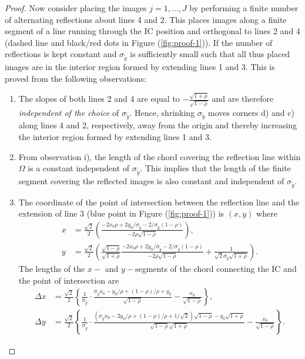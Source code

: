 \begin{proof}
  Now consider placing the images $j = 1, \ldots, J$ by performing a
  finite number of alternating reflections about lines 4 and 2. This
  places images along a finite segment of a line running through the
  IC position and orthogonal to lines 2 and 4 (dashed line and
  black/red dots in Figure (\ref{fig:proof-1})). If the number of
  reflections is kept constant and $\sigma_{\tilde{y}}$ is sufficiently
  small such that all thus placed images are in the interior region
  formed by extending lines 1 and 3. This is proved from the following
  observations:
  \begin{enumerate}
  \item The slopes of both lines 2 and 4 are equal to
    $-\frac{\sqrt{1+\rho}}{\sqrt{1-\rho}}$ and are therefore
    \textit{independent of the choice} of $\sigma_{\tilde{y}}$. Hence,
    shrinking $\sigma_{\tilde{y}}$ moves corners d) and c) along lines 4
    and 2, respectively, away from the origin and thereby increasing
    the interior region formed by extending lines 1 and 3.
  \item From observation i), the length of the chord covering the
    reflection line within $\Omega$ is a constant independent of
    $\sigma_{\tilde{y}}$.  This implies that the length of the finite
    segment covering the reflected images is also constant and
    independent of $\sigma_{\tilde{y}}$.
  \item The coordinate of the point of intersection between the
    reflection line and the extension of line 3 (blue point in Figure
    (\ref{fig:proof-1})) is $(x,y)$ where
    \begin{align*}
      x &= \frac{\sqrt{2}}{2} \left( \frac{-2 x_0\rho + 2
      y_0/\sigma_{\tilde{y}} -
      2/\sigma_{\tilde{y}}(1-\rho)}{-2\rho\sqrt{1-\rho}}\right), \\
      y &= \frac{\sqrt{2}}{2} \left( \frac{\sqrt{1-\rho}}{\sqrt{1+\rho}}\frac{-2 x_0\rho + 2
      y_0/\sigma_{\tilde{y}} -
      2/\sigma_{\tilde{y}}(1-\rho)}{-2\rho\sqrt{1-\rho}} +
      \frac{1}{\sqrt{2}\sigma_{\tilde{y}}\sqrt{1+\rho}} \right).
    \end{align*}
    The lengths of the $x-$ and $y-$segments of the chord connecting
    the IC and the point of intersection are
    \begin{align*}
      \Delta x &= \frac{\sqrt{2}}{2}\left\{ \frac{1}{\sigma_{\tilde{y}}}\cdot\frac{\sigma_{\tilde{y}}x_0 - y_0/\rho + (1-\rho)/\rho + y_0}{\sqrt{1-\rho}} - \frac{x_0}{\sqrt{1-\rho}} \right\},\\
      \Delta y &= \frac{\sqrt{2}}{2} \left\{ \frac{1}{\sigma_{\tilde{y}}}\cdot\frac{(\sigma_{\tilde{y}}x_0 - 2y_0/\rho + (1-\rho)/\rho + 1/\sqrt{2})\sqrt{1-\rho} - y_0\sqrt{1+\rho}}{\sqrt{1-\rho}\sqrt{1+\rho}}- \frac{x_0}{\sqrt{1-\rho}} \right\}.

\end{align*}
\end{enumerate}
\end{proof}
